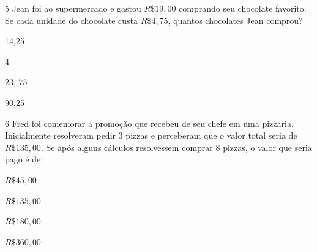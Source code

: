 \num{5}  Jean foi ao supermercado e gastou $R\$19,00$ comprando seu chocolate
favorito. Se cada unidade do chocolate custa $R\$4,75$, quantos
chocolates Jean comprou?

\begin{escolha}
\item14,25
\item4
\item $23$, $75$
\item90,25
\end{escolha}



\num{6}  Fred foi comemorar a promoção que recebeu de seu chefe em uma
pizzaria. Inicialmente resolveram pedir $3$ pizzas e perceberam que o
valor total seria de $R\$135,00$. Se após alguns cálculos resolvessem
comprar $8$ pizzas, o valor que seria pago é de:

\begin{escolha}
\item $R\$45,00$
\item $R\$135,00$
\item $R\$180,00$
\item $R\$360,00$
\end{escolha}


